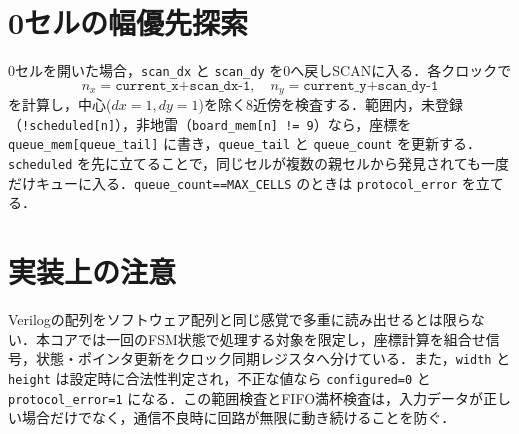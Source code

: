 \section{0セルの幅優先探索}
0セルを開いた場合，\texttt{scan\_dx} と \texttt{scan\_dy} を0へ戻しSCANに入る．各クロックで
\[
  n_x=\texttt{current\_x+scan\_dx-1},\quad
  n_y=\texttt{current\_y+scan\_dy-1}
\]
を計算し，中心(\(dx=1,dy=1\))を除く8近傍を検査する．範囲内，未登録（\texttt{!scheduled[n]}），非地雷（\texttt{board\_mem[n] != 9}）なら，座標を \texttt{queue\_mem[queue\_tail]} に書き，\texttt{queue\_tail} と \texttt{queue\_count} を更新する．\texttt{scheduled} を先に立てることで，同じセルが複数の親セルから発見されても一度だけキューに入る．\texttt{queue\_count==MAX\_CELLS} のときは \texttt{protocol\_error} を立てる．

\section{実装上の注意}
Verilogの配列をソフトウェア配列と同じ感覚で多重に読み出せるとは限らない．本コアでは一回のFSM状態で処理する対象を限定し，座標計算を組合せ信号，状態・ポインタ更新をクロック同期レジスタへ分けている．また，\texttt{width} と \texttt{height} は設定時に合法性判定され，不正な値なら \texttt{configured=0} と \texttt{protocol\_error=1} になる．この範囲検査とFIFO満杯検査は，入力データが正しい場合だけでなく，通信不良時に回路が無限に動き続けることを防ぐ．
